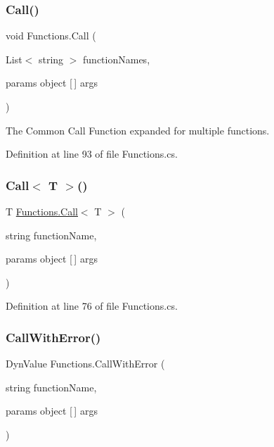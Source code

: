 \subsubsection{\texorpdfstring{Call()}{Call()}\hspace{0.1cm}{\footnotesize\ttfamily [2/2]}}
{\footnotesize\ttfamily void Functions.\+Call (\begin{DoxyParamCaption}\item[{List$<$ string $>$}]{function\+Names,  }\item[{params object \mbox{[}$\,$\mbox{]}}]{args }\end{DoxyParamCaption})}



The Common Call Function expanded for multiple functions. 



Definition at line 93 of file Functions.\+cs.

\mbox{\label{class_functions_a6dd52370fc31e2190479683765fff302}} 
\subsubsection{\texorpdfstring{Call$<$ T $>$()}{Call< T >()}}
{\footnotesize\ttfamily T \hyperlink{class_functions_ae33add32d22cc0eea74eaca446e03111}{Functions.\+Call}$<$ T $>$ (\begin{DoxyParamCaption}\item[{string}]{function\+Name,  }\item[{params object \mbox{[}$\,$\mbox{]}}]{args }\end{DoxyParamCaption})}



Definition at line 76 of file Functions.\+cs.

\mbox{\label{class_functions_a920863b00e31bb1c7c24e838d9639016}} 
\subsubsection{\texorpdfstring{Call\+With\+Error()}{CallWithError()}}
{\footnotesize\ttfamily Dyn\+Value Functions.\+Call\+With\+Error (\begin{DoxyParamCaption}\item[{string}]{function\+Name,  }\item[{params object \mbox{[}$\,$\mbox{]}}]{args }\end{DoxyParamCaption})}



